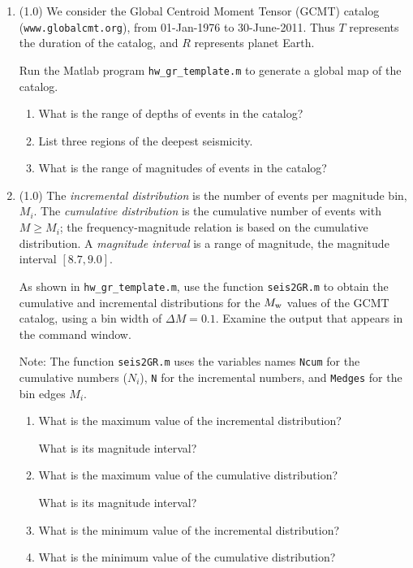 \documentclass[11pt,titlepage,fleqn]{article}
\begin{document}
\begin{enumerate}
\item (1.0) We consider the Global Centroid Moment Tensor (GCMT) catalog (\verb+www.globalcmt.org+), from 01-Jan-1976 to 30-June-2011. Thus $T$ represents the duration of the catalog, and $R$ represents planet Earth.

Run the Matlab program \verb+hw_gr_template.m+ to generate a global map of the catalog.
%
\begin{enumerate}
\item What is the range of depths of events in the catalog?
\item List three regions of the deepest seismicity.
\item What is the range of magnitudes of events in the catalog?
\end{enumerate}

\item (1.0) The {\em incremental distribution} is the number of events per magnitude bin, $M_i$. The {\em cumulative distribution} is the cumulative number of events with $M \ge M_i$; the frequency-magnitude relation is based on the cumulative distribution. A {\em magnitude interval} is a range of magnitude, \eg the magnitude interval $[8.7,9.0]$.

As shown in \verb+hw_gr_template.m+, use the function \verb+seis2GR.m+ to obtain the cumulative and incremental distributions for the $M_{\rm w}$ values of the GCMT catalog, using a bin width of $\Delta M = 0.1$. Examine the output that appears in the command window.

Note: The function \verb+seis2GR.m+ uses the variables names \verb+Ncum+ for the cumulative numbers ($N_i$), \verb+N+ for the incremental numbers, and \verb+Medges+ for the bin edges $M_i$.

\begin{enumerate}
\item What is the maximum value of the incremental distribution?

What is its magnitude interval?

\item What is the maximum value of the cumulative distribution?

What is its magnitude interval?

\item What is the minimum value of the incremental distribution? 

\item What is the minimum value of the cumulative distribution? 
\end{enumerate}


\end{enumerate}
\end{document}
